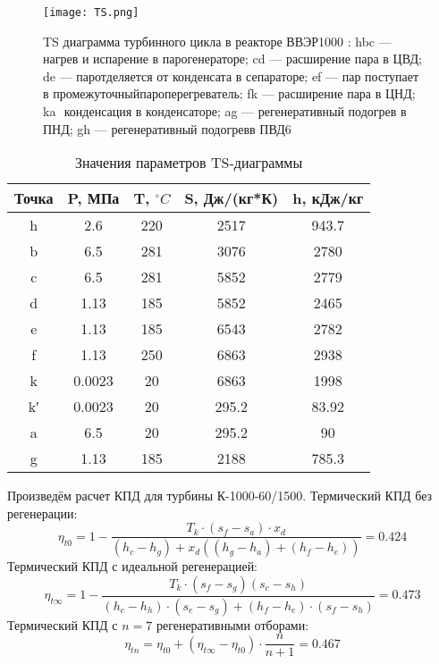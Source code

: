 \begin{figure}[H]
	\begin{center}
		\texttt{[image: TS.png]}
		\caption{ T­S диаграмма турбинного цикла в реакторе ВВЭР­1000 : hbc —нагрев и испарение в парогенераторе; cd — расширение пара в ЦВД; de — паротделяется от конденсата в сепараторе; ef — пар поступает в промежуточныйпароперегреватель; fk — расширение пара в ЦНД; ka ­ конденсация в конден­саторе; ag — регенеративный подогрев в ПНД; gh — регенеративный подогревв ПВД6
        }
		\label{pic:TS} %
	\end{center}
\end{figure}

\begin{table}[H]
	\caption{Значения параметров TS-диаграммы}
	\begin{center}
        \begin{tabular}{|c|c|c|c|c|}
        \toprule
         Точка & P, МПа & T, $^\circ C$ & S, Дж/(кг*К) & h, кДж/кг \\ 
         \midrule
         \hline
          h &  2.6 & 220 & 2517 & 943.7\\ 
         \hline
          b & 6.5 & 281 & 3076 & 2780 \\ 
         \hline
          c & 6.5 & 281 & 5852 & 2779\\ 
         \hline
          d & 1.13 & 185 & 5852 & 2465 \\ 
         \hline
          e & 1.13 & 185 & 6543 & 2782 \\ 
         \hline
          f & 1.13 & 250  & 6863 & 2938 \\ 
         \hline
          k & 0.0023 & 20 & 6863 & 1998 \\ 
         \hline
          k′ & 0.0023 & 20 & 295.2 & 83.92 \\ 
         \hline
          a & 6.5 & 20 & 295.2 & 90 \\ 
         \hline
          g & 1.13 & 185 & 2188 & 785.3 \\ 
         \bottomrule
		\end{tabular}
		\label{tabular:coeffs}
	\end{center}
\end{table}

Произведём расчет КПД для турбины К-1000-60/1500. Термический КПД без регенерации:
$$
η_{t0} = 1 -
\frac{T_{k} ⋅ \left( s_{f} - s_{a} \right) ⋅ x_{d}}
{\left( h_{c} - h_{g} \right) +x_{d}\left( \left( h_{g} - h_{a} \right) + \left( h_{f} - h_{e} \right) \right)} = 0.424
$$
Термический КПД с идеальной регенерацией:
$$
η_{t∞} = 1 -
\frac{T_{k} ⋅ \left( s_{f} - s_{g} \right) \left( s_{c} - s_{h} \right)}
{\left(h_{c} - h_{h}\right) ⋅ \left( s_{e} - s_{g} \right) + \left( h_{f} - h_{e} \right) ⋅ \left( s_{f} - s_{h} \right)} = 0.473
$$
Термический КПД с $n = 7$  регенеративными отборами:
$$
η_{tn} = η_{t0} + \left( η_{t∞} - η_{t0} \right) ⋅ \frac{n}{n+1} = 0.467
$$


